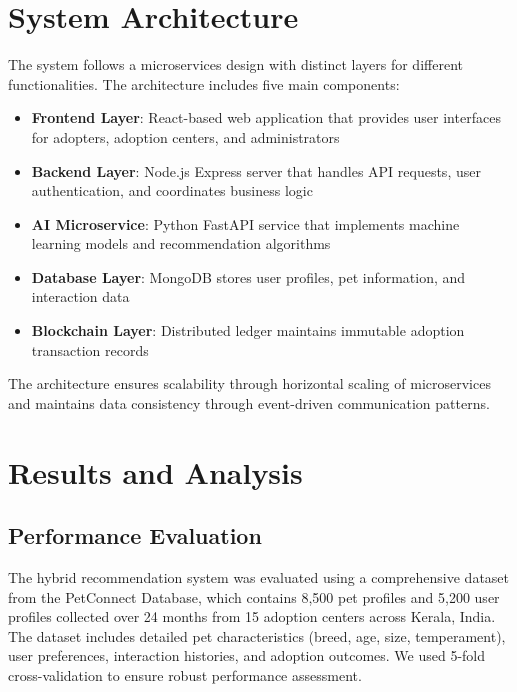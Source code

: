 \documentclass[conference]{IEEEtran}
\begin{document}
\section{System Architecture}

The system follows a microservices design with distinct layers for different functionalities. The architecture includes five main components:

\begin{itemize}
\item \textbf{Frontend Layer}: React-based web application that provides user interfaces for adopters, adoption centers, and administrators
\item \textbf{Backend Layer}: Node.js Express server that handles API requests, user authentication, and coordinates business logic
\item \textbf{AI Microservice}: Python FastAPI service that implements machine learning models and recommendation algorithms
\item \textbf{Database Layer}: MongoDB stores user profiles, pet information, and interaction data
\item \textbf{Blockchain Layer}: Distributed ledger maintains immutable adoption transaction records
\end{itemize}

The architecture ensures scalability through horizontal scaling of microservices and maintains data consistency through event-driven communication patterns.

\section{Results and Analysis}

\subsection{Performance Evaluation}

The hybrid recommendation system was evaluated using a comprehensive dataset from the PetConnect Database, which contains 8,500 pet profiles and 5,200 user profiles collected over 24 months from 15 adoption centers across Kerala, India. The dataset includes detailed pet characteristics (breed, age, size, temperament), user preferences, interaction histories, and adoption outcomes. We used 5-fold cross-validation to ensure robust performance assessment.
\end{document}
